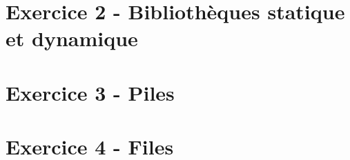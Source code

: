 \documentclass[12pt,a4paper]{article}
\begin{document}
\vspace*{0.7cm}



\clearpage

\section{Exercice 2 - Bibliothèques statique et dynamique}

\vspace*{0.7cm}



\clearpage

\section{Exercice 3 - Piles}

\vspace*{0.7cm}



\clearpage

\section{Exercice 4 - Files}

\vspace*{0.7cm}



\clearpage

%
%
%
\end{document}
